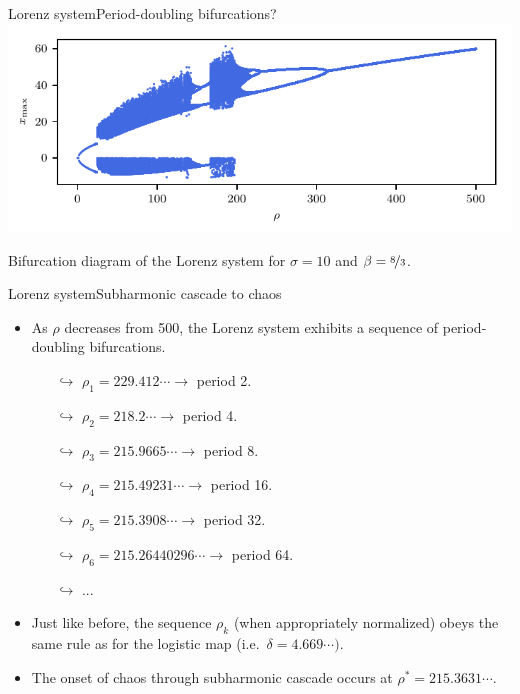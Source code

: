 \documentclass[usenames,dvipsnames,svgnames,10pt,aspectratio=169]{beamer}
\begin{document}
\begin{frame}[t, c]{Lorenz system}{Period-doubling bifurcations?}
	\centering
	\includegraphics[width=.75\textwidth]{lorenz_bifurcation_diagram_2}

	Bifurcation diagram of the Lorenz system for $\sigma=10$ and $\beta = \nicefrac{8}{3}$.
	\vspace{1cm}
\end{frame}

\begin{frame}[t, c]{Lorenz system}{Subharmonic cascade to chaos}
	\begin{itemize}
		\item As $\rho$ decreases from 500, the Lorenz system exhibits a sequence of period-doubling bifurcations.
		\begin{itemize}
			\item[$\hookrightarrow$] $\rho_1 = 229.412 \cdots \to$ period 2.
			\item[$\hookrightarrow$] $\rho_2 = 218.2 \cdots \to$ period 4.
			\item[$\hookrightarrow$] $\rho_3 = 215.9665 \cdots \to$ period 8.
			\item[$\hookrightarrow$] $\rho_4 = 215.49231 \cdots \to$ period 16.
			\item[$\hookrightarrow$] $\rho_5 = 215.3908 \cdots \to$ period 32.
			\item[$\hookrightarrow$] $\rho_6 = 215.26440296 \cdots \to$ period 64.
			\item[$\hookrightarrow$] ...
		\end{itemize}

		\bigskip

		\item Just like before, the sequence $\rho_k$ (when appropriately normalized) obeys the same rule as for the logistic map (i.e.\ $\delta = 4.669 \cdots)$.

		\bigskip

		\item The onset of chaos through subharmonic cascade occurs at $\rho^* = 215.3631 \cdots$.
	\end{itemize}

	\vspace{1cm}
\end{frame}
\end{document}
